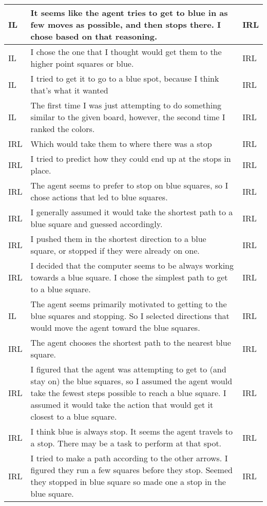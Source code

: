 \documentclass{article}
\begin{document}
\begin{longtable}{ | m{0.6in} | m{5in}| m{0.6in} | }
IL & It seems like the agent tries to get to blue in as few moves as possible, and then stops there. I chose based on that reasoning. & IRL \\ \hline
IL & I chose the one that I thought would get them to the higher point squares or blue. & IRL \\ \hline
IL & I tried to get it to go to a blue spot, because I think that's what it wanted & IRL \\ \hline
IL & The first time I was just attempting to do something similar to the given board, however, the second time I ranked the colors.  & IRL \\ \hline
IRL & Which would take them to where there was a stop & IRL \\ \hline
IRL & I tried to predict how they could end up at the stops in place. & IRL \\ \hline
IRL & The agent seems to prefer to stop on blue squares, so I chose actions that led to blue squares. & IRL \\ \hline
IRL & I generally assumed it would take the shortest path to a blue square and guessed accordingly. & IRL \\ \hline
IRL & I pushed them in the shortest direction to a blue square, or stopped if they were already on one. & IRL \\ \hline
IRL & I decided that the computer seems to be always working towards a blue square. I chose the simplest path to get to a blue square.  & IRL \\ \hline
IL & The agent seems primarily motivated to getting to the blue squares and stopping. So I selected directions that would move the agent toward the blue squares. & IRL \\ \hline
IRL & The agent chooses the shortest path to the nearest blue square. & IRL \\ \hline
IRL & I figured that the agent was attempting to get to (and stay on) the blue squares, so I assumed the agent would take the fewest steps possible to reach a blue square. I assumed it would take the action that would get it closest to a blue square. & IRL \\ \hline
IRL & I think blue is always stop. It seems the agent travels to a stop. There may be a task to perform at that spot. & IRL \\ \hline
IRL & I tried to make a path according to the other arrows. I figured they run a few squares before they stop. Seemed they stopped in blue square so made one a stop in the blue square. & IRL \\ \hline

\end{longtable}
\end{document}
